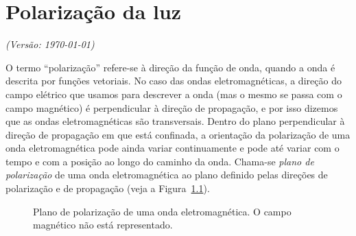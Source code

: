 \chapter{Polarização da luz}
\textsl{{\sffamily(Versão: \today)}}

\noindent
O termo ``polarização'' refere-se à direção da função de onda, quando a onda é
descrita por funções vetoriais. No caso das ondas eletromagnéticas, a
direção do campo elétrico que usamos para descrever a onda (mas o mesmo se passa
com o campo magnético) é perpendicular à direção de propagação, e por isso
dizemos que as ondas eletromagnéticas são transversais. Dentro do plano
perpendicular à direção de propagação em que está confinada, a orientação da
polarização de uma onda eletromagnética pode ainda variar continuamente e pode
até variar com o tempo e com a posição ao longo do caminho da onda.  Chama-se
\emph{plano de polarização} de uma onda eletromagnética ao plano definido pelas
direções de polarização e de propagação (veja a Figura~\ref{fig:polpln}).
\begin{figure}[htb]
    \small
    \sffamily
    {\centering
    \def\zangle{-20}
    \def\xangle{20}

    \par
}
\caption{Plano de polarização de uma onda eletromagnética. O campo magnético não
está representado.\label{fig:polpln}}
\end{figure}
